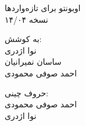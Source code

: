 \thispagestyle{empty}
\begin{center}
\Titrh اوبونتو برای تازه‌واردها\\
\Yagut نسخه ۱۴/۰۴\\
\par\vspace{29mm}
\Titrc به کوشش: \\
\Yagut نوا اژدری \\
\Yagut ساسان نمیرانیان \\
\Yagut احمد صوفی محمودی \\
\par\vspace{29mm}
\Titrc حروف چینی: \\
\Yagut احمد صوفی محمودی \\
\Yagut نوا اژدری
\end {center}
\newpage
